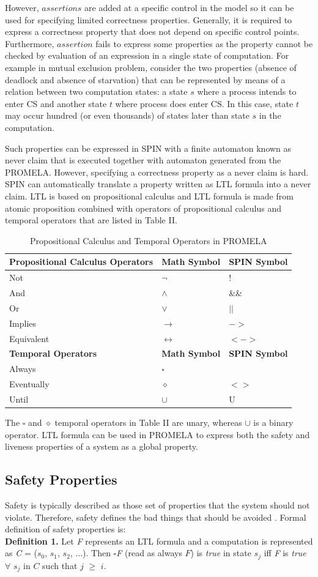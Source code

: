 \documentclass[conference]{IEEEtran}
\begin{document}
However, $assertions$ are added at a specific control in the model so it can be used for specifying limited correctness properties. 
Generally, it is required to express a correctness property that does not depend on specific control points. Furthermore, $assertion$ fails 
to express some properties as the property cannot be checked by evaluation of an expression in a single state of computation. For example in
mutual exclusion problem, consider the two properties (absence of deadlock and absence of starvation) that can be represented by means of a 
relation between two computation states: a state $s$ where a process intends to enter CS and another state $t$ where process does enter CS. In this 
case, state $t$ may occur hundred (or even thousands) of states later than state $s$ in the computation. 

Such properties can be expressed in SPIN with a finite automaton known as never claim that is executed together with automaton generated from 
the PROMELA. However, specifying a correctness property as a never claim is hard. SPIN can automatically translate a property written as LTL 
formula into a never claim.  LTL is based on propositional calculus and LTL formula is made from atomic proposition combined with operators of 
propositional calculus and temporal operators that are listed in Table II.
\begin{table}[!ht]
\caption{Propositional Calculus and Temporal Operators in PROMELA}
\centering
 \begin{tabular}{|>{\centering}p{2.5cm}|>{\centering} p{2cm} |>{\centering} p{2cm} |}
 \hline
\textbf{Propositional Calculus Operators} & \textbf{Math Symbol} & \textbf{SPIN Symbol}\tabularnewline
\hline
Not & $\neg$ & !\tabularnewline
And & $\land$ & \&\&\tabularnewline
Or & $\lor$ &$||$\tabularnewline
Implies & $\rightarrow$ & $->$\tabularnewline
Equivalent & $\leftrightarrow$ & $<->$\tabularnewline
\hline
\textbf{Temporal Operators} & \textbf{Math Symbol} & \textbf{SPIN Symbol}\tabularnewline
\hline
Always & $\square$ & [ ]\tabularnewline
Eventually & $\diamond$ & $<>$\tabularnewline
Until & $\cup$ & U\tabularnewline
\hline
\end{tabular}    
\end{table}

The $\square$ and $\diamond$  temporal operators in Table II are unary, whereas $\cup$ is a binary operator. 
LTL formula can be used in PROMELA to express both the safety and liveness properties of a system as a global property. 

\subsection{Safety Properties}
Safety is typically described as those set of properties that the system should not violate. Therefore, 
safety defines the bad things that should be avoided \cite{17}. Formal definition of safety properties is: \\
\textbf{Definition 1.} Let \emph{F} represents an LTL formula and a computation is represented as \emph{C} 
= ($s_0$, $s_1$, $s_2$, ...). Then $\square$\emph{F} (read as always $F$) is \emph{true} in state $s_j$ iff \emph{F} is \emph{true} $\forall$ 
$s_j$ in $C$ such that $j$ $\geq$ $i$.
\end{document}
